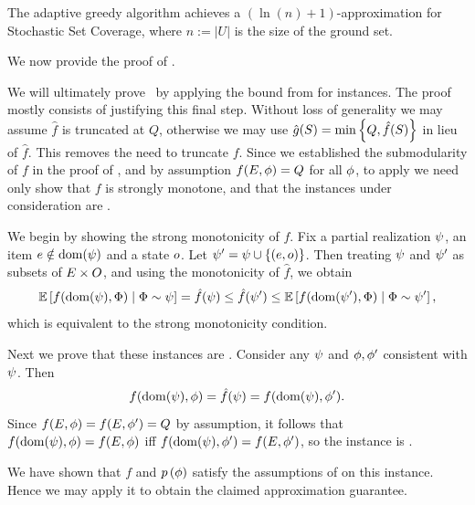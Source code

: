 \begin{corollary} \label{thm:stochastic-set-cover}
The adaptive greedy algorithm  achieves a $(\ln(n) + 1)$-approximation for Stochastic Set Coverage, where $n := |U|$ is the size of the ground set.
\end{corollary}



\noindent
We now provide the proof of .\\

\begin{proofof}{}
We will ultimately prove~ by applying the bound from 
 for \certifying instances.
The proof mostly consists of justifying this final step. 
Without loss of generality we may assume 
$\hat{f}$ is truncated at $Q$, otherwise we may use 
$\hat{g}(S) = \min \set{Q, \hat{f}(S)}$ in lieu of $\hat{f}$.
This removes the need to truncate $f$.
Since we established the \term submodularity of $f$ in the proof of
, and by assumption $f(E, \rlz) = Q$ for all $\rlz$, 
to apply  we need only show
that $f$ is strongly \term monotone, 
and that the instances under consideration are \certifying.


We begin by showing the strong \term monotonicity of $f$.
Fix a partial realization $\prlz$, an item $\elem \notin \dom(\prlz)$
and a state $\outcome$.  Let 
$\prlz' = \prlz \cup \set{(\elem,\outcome)}$.
Then treating $\prlz$ and $\prlz'$ as subsets of $\groundset \times \outcomes$, and
using the monotonicity of $\hat{f}$, we obtain
$$\progress{\prlz} = \hat{f}(\prlz) \le
\hat{f}(\prlz') \le \progress{\prlz'},$$
which is equivalent to the strong \term monotonicity condition.


Next we prove that these instances are \certifying.
Consider any $\prlz$ and $\rlz, \rlz'$ consistent with $\prlz$.
Then 
$$f(\dom(\prlz), \rlz) =  \hat{f}(\prlz) =  f(\dom(\prlz), \rlz').$$
Since $f(\groundset, \rlz) = f(\groundset, \rlz') = Q$ by assumption, 
it follows that $f(\dom(\prlz), \rlz) = f(\groundset, \rlz)$ iff 
$f(\dom(\prlz), \rlz') = f(\groundset, \rlz')$, so the instance is \certifying.


We have shown that $f$ and $\rlzprior$ satisfy the assumptions of 
 on this \certifying
instance.  Hence we may apply it 
to obtain the claimed approximation guarantee. 
\end{proofof}



%
%
%
%

